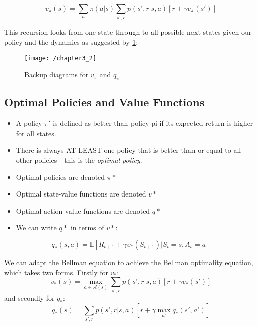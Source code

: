 \begin{equation}
v_\pi(s) = \sum_{a} \pi(a|s) \sum_{s',r} p(s', r | s, a) \left[r + \gamma v_\pi(s')\right]
\end{equation}

This recursion looks from one state through to all possible next states given our policy and the dynamics as suggested by \ref{fig:backup}:
\begin{figure}[h!]
	\centering
	\texttt{[image: /chapter3\_2]}
	\caption{Backup diagrams for \(v_\pi\) and \(q_\pi\)}
	\label{fig:backup}
\end{figure}

\subsection{Optimal Policies and Value Functions}
\begin{itemize}
\item A policy \(\pi '\) is defined as better than policy pi if its expected return is higher for all states.
\item There is always AT LEAST one policy that is better than or equal to all other policies - this is the \textit{optimal policy}.
\item Optimal policies are denoted \(\pi*\)
\item Optimal state-value functions are denoted \(v*\)
\item Optimal action-value functions are denoted \(q*\)
\item We can write \(q*\) in terms of \(v*\):
\end{itemize}

\begin{equation}
q_*(s,a) = \mathbb{E} \left[R_{t+1} + \gamma v_*(S_{t+1}) | S_t = s, A_t = a \right]
\end{equation}

We can adapt the Bellman equation to achieve the Bellman optimality equation, which takes two forms. Firstly for \(v_*\):
\begin{equation}
v_*(s) = \max_{a \in \mathcal{A}(s)} \sum_{s',r} p(s', r | s, a) \left[r + \gamma v_*(s')\right]
\end{equation}
and secondly for \(q_*\):
\begin{equation}
q_*(s) = \sum_{s',r} p(s', r | s, a) \left[r + \gamma \max_{a'} q_*(s', a') \right]
\end{equation}

